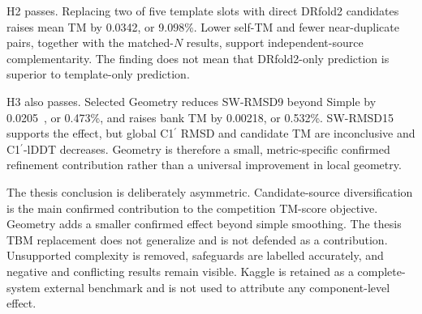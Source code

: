 \documentclass[12pt,a4paper,oneside]{report}
\newcommand{\cprime}{C1$^{\prime}$}
\newcommand{\angstrom}{\text{\AA}}
\begin{document}
H2 passes. Replacing two of five template slots with direct DRfold2 candidates raises
mean TM by 0.0342, or 9.098\%. Lower self-TM and fewer near-duplicate pairs, together
with the matched-$N$ results, support independent-source complementarity. The finding
does not mean that DRfold2-only prediction is superior to template-only prediction.

H3 also passes. Selected Geometry reduces SW-RMSD9 beyond Simple by
0.0205~\angstrom{}, or 0.473\%, and raises bank TM by 0.00218, or 0.532\%. SW-RMSD15
supports the effect, but global \cprime{} RMSD and candidate TM are inconclusive and
\cprime{}-lDDT decreases. Geometry is therefore a small, metric-specific confirmed
refinement contribution rather than a universal improvement in local geometry.

The thesis conclusion is deliberately asymmetric. Candidate-source diversification
is the main confirmed contribution to the competition TM-score objective. Geometry
adds a smaller confirmed effect beyond simple smoothing. The thesis TBM replacement
does not generalize and is not defended as a contribution. Unsupported complexity is
removed, safeguards are labelled accurately, and negative and conflicting results
remain visible. Kaggle is retained as a complete-system external benchmark and is not
used to attribute any component-level effect.


\end{document}

